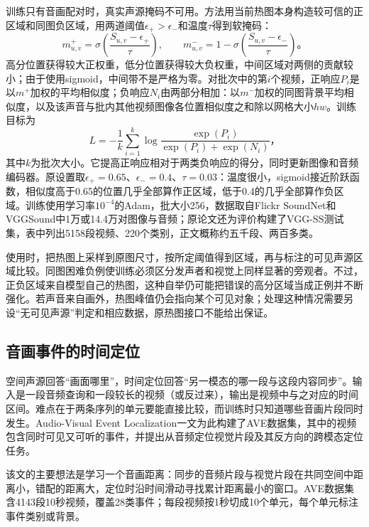 训练只有音画配对时，真实声源掩码不可用。方法用当前热图本身构造较可信的正区域和同图负区域，用两道阈值$\epsilon_+>\epsilon_-$和温度$\tau$得到软掩码：
\[
  m^+_{u,v}=\sigma\!\left(\frac{S_{u,v}-\epsilon_+}{\tau}\right),
  \qquad
  m^-_{u,v}=1-\sigma\!\left(\frac{S_{u,v}-\epsilon_-}{\tau}\right)\text{。}
\]
高分位置获得较大正权重，低分位置获得较大负权重，中间区域对两侧的贡献较小；由于使用sigmoid，中间带不是严格为零。对批次中的第$i$个视频，正响应$P_i$是以$m^+$加权的平均相似度；负响应$N_i$由两部分相加：以$m^-$加权的同图背景平均相似度，以及该声音与批内其他视频图像各位置相似度之和除以网格大小$hw$。训练目标为
\begin{equation}
  L=-\frac1k\sum_{i=1}^{k}\log\frac{\exp(P_i)}{\exp(P_i)+\exp(N_i)}\text{，}
  \label{eq:vision-sound-loss}
\end{equation}
其中$k$为批次大小。它提高正响应相对于两类负响应的得分，同时更新图像和音频编码器。原设置取$\epsilon_+=0.65$、$\epsilon_-=0.4$、$\tau=0.03$：温度很小，sigmoid接近阶跃函数，相似度高于0.65的位置几乎全部算作正区域，低于0.4的几乎全部算作负区域。训练使用学习率$10^{-4}$的Adam，批大小256，数据取自Flickr SoundNet和VGGSound中1万或14.4万对图像与音频；原论文还为评价构建了VGG-SS测试集，表中列出5158段视频、220个类别，正文概称约五千段、两百多类。

使用时，把热图上采样到原图尺寸，按所定阈值得到区域，再与标注的可见声源区域比较。同图困难负例使训练必须区分发声者和视觉上同样显著的旁观者。不过，正负区域来自模型自己的热图，这种自举仍可能把错误的高分区域当成正例并不断强化。若声音来自画外，热图峰值仍会指向某个可见对象；处理这种情况需要另设“无可见声源”判定和相应数据，原热图接口不能给出保证。

\subsection{音画事件的时间定位}
\label{sec:vision-understanding-av-time}

空间声源回答“画面哪里”，时间定位回答“另一模态的哪一段与这段内容同步”。输入是一段音频查询和一段较长的视频（或反过来），输出是视频中与之对应的时间区间。难点在于两条序列的单元要能直接比较，而训练时只知道哪些音画片段同时发生。Audio-Visual Event Localization一文为此构建了AVE数据集，其中的视频包含同时可见又可听的事件，并提出从音频定位视觉片段及其反方向的跨模态定位任务。

该文的主要想法是学习一个音画距离：同步的音频片段与视觉片段在共同空间中距离小，错配的距离大，定位时沿时间滑动寻找累计距离最小的窗口。AVE数据集含4143段10秒视频，覆盖28类事件；每段视频按1秒切成10个单元，每个单元标注事件类别或背景。

